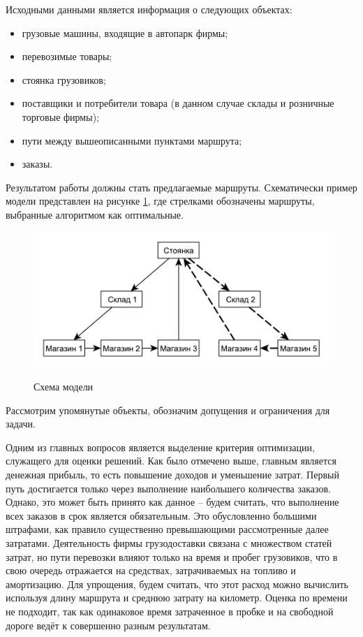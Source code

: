 	Исходными данными является информация о следующих объектах:
	\begin{itemize}
		\item грузовые машины, входящие в автопарк фирмы;
		\item перевозимые товары;
		\item стоянка грузовиков;
		\item поставщики и потребители товара (в данном случае склады и розничные торговые фирмы);
		\item пути между вышеописанными пунктами маршрута;
		\item заказы.
	\end{itemize}

	Результатом работы должны стать предлагаемые маршруты. Схематически пример модели представлен на рисунке \ref{pic:model}, где стрелками обозначены маршруты, выбранные алгоритмом как оптимальные.
	
	\begin{figure}[h!] 
		\begin{center}
			{\includegraphics[scale=0.9, angle=0]{img/model.pdf}}
			\caption{Схема модели}
			\label{pic:model}
		\end{center}
	\end{figure}
	
	Рассмотрим упомянутые объекты, обозначим допущения и ограничения для задачи.
	
	Одним из главных вопросов является выделение критерия оптимизации, служащего для оценки решений. Как было отмечено выше, главным является денежная прибыль, то есть повышение доходов и уменьшение затрат.   
	Первый путь достигается только через выполнение наибольшего количества заказов. Однако, это может быть принято как данное -- будем считать, что выполнение всех заказов в срок является обязательным. Это обусловленно большими штрафами, как правило существенно превышающими рассмотренные далее затратами.   
	Деятельность фирмы грузодоставки связана с множеством статей затрат, но пути перевозки влияют только на время и пробег грузовиков, что в свою очередь отражается на средствах, затрачиваемых на топливо и амортизацию. Для упрощения, будем считать, что этот расход можно вычислить используя длину маршрута и среднюю затрату на километр. Оценка по времени не подходит, так как одинаковое время затраченное в пробке и на свободной дороге ведёт к совершенно разным результатам.
	
